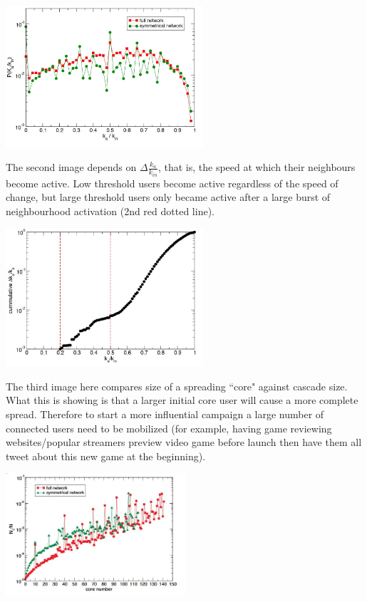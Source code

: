 {
\centering
\includegraphics[width=0.55\textwidth]{notes/img/n3_15M.JPG} \par
}

The second image depends on $\Delta \frac{k_a}{k_{in}}$, that is, the speed at which their neighbours become active. Low threshold users become active regardless of the speed of change, but large threshold users only became active after a large burst of neighbourhood activation (2nd red dotted line). 

{
\centering
\includegraphics[width=0.55\textwidth]{notes/img/n3_cumulative.JPG} \par
}

The third image here compares size of a spreading ``core" against cascade size. What this is showing is that a larger initial core user will cause a more complete spread. Therefore to start a more influential campaign a large number of connected users need to be mobilized (for example, having game reviewing websites/popular streamers preview video game before launch then have them all tweet about this new game at the beginning). 

{
\centering
\includegraphics[width=0.5\textwidth]{notes/img/n3_core.JPG} \par
}

